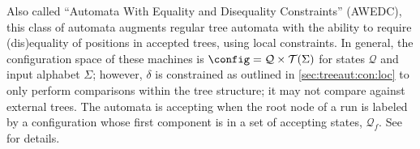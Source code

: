 Also called ``Automata With Equality and Disequality Constraints'' (AWEDC),
this class of automata augments regular tree automata with the ability to
require (dis)equality of positions in accepted trees, using local
constraints.  In general, the configuration space of these machines is
$\config = \mathcal{Q} \times \mathcal{T}(\Sigma)$ for states $\mathcal{Q}$
and input alphabet $\Sigma$; however, $\delta$ is constrained as outlined in
\autoref{sec:treeaut:con:loc} to only perform comparisons within the tree
structure; it may not compare against external trees.  The automata is
accepting when the root node of a run is labeled by a configuration whose
first component is in a set of accepting states, $\mathcal{Q}_f$.  See
\cite[Sec 4.2]{tata} for details.

